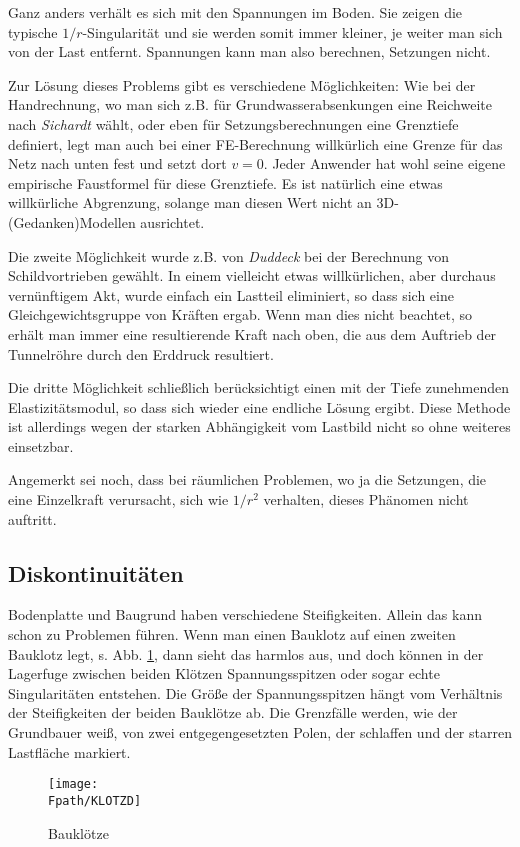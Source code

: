 {{Ganz anders verh\"{a}lt es sich mit den Spannungen im Boden. Sie zeigen die typische $1/r$-Singularit\"{a}t und sie werden somit immer kleiner, je weiter man sich von der Last entfernt. Spannungen kann man also berechnen, Setzungen nicht.

Zur L\"{o}sung dieses Problems gibt es verschiedene M\"{o}glichkeiten: Wie bei der Handrechnung, wo man sich z.B. f\"{u}r Grundwasserabsenkungen eine Reichweite nach {\em Sichardt\/} w\"{a}hlt, oder eben f\"{u}r Setzungsberechnungen eine Grenztiefe definiert, legt man auch bei einer FE-Berechnung willk\"{u}rlich eine Grenze f\"{u}r das Netz nach unten fest und setzt dort $v = 0$. Jeder Anwender hat wohl seine eigene empirische Faustformel f\"{u}r diese Grenztiefe. Es ist nat\"{u}rlich eine etwas willk\"{u}rliche Abgrenzung, solange man diesen Wert nicht an 3D-(Gedanken)Modellen ausrichtet.

Die zweite M\"{o}glichkeit wurde z.B. von {\em Duddeck\/} bei der Berechnung von Schildvortrieben gew\"{a}hlt. In einem vielleicht etwas willk\"{u}rlichen, aber durchaus vern\"{u}nftigem Akt, wurde einfach ein Lastteil eliminiert, so dass sich eine Gleichgewichtsgruppe von Kr\"{a}ften ergab. Wenn man dies nicht beachtet, so erh\"{a}lt man immer eine resultierende Kraft nach oben, die aus dem Auftrieb der Tunnelr\"{o}hre durch den Erddruck resultiert.

Die dritte M\"{o}glichkeit schlie{\ss}lich ber\"{u}cksichtigt einen mit der Tiefe zunehmenden Elastizit\"{a}tsmodul, so dass sich wieder eine endliche L\"{o}sung ergibt. Diese Methode ist allerdings wegen der starken Abh\"{a}ngigkeit vom Lastbild nicht so ohne weiteres einsetzbar.

Angemerkt sei noch, dass bei r\"{a}umlichen Problemen, wo ja die Setzungen, die eine Einzelkraft verursacht, sich wie $1/r^2$ verhalten, dieses Ph\"{a}nomen nicht auftritt.

{\textcolor{sectionTitleBlue}{\subsection{Diskontinuit\"{a}ten}}}
Bodenplatte und Baugrund haben verschiedene Steifigkeiten. Allein das kann schon zu Problemen f\"{u}hren. Wenn man einen Bauklotz auf einen zweiten Bauklotz legt, s. Abb. \ref{Klotz}, dann sieht das harmlos aus, und doch k\"{o}nnen in der Lagerfuge zwischen beiden Kl\"{o}tzen Spannungsspitzen oder sogar echte Singularit\"{a}ten entstehen. Die Gr\"{o}{\ss}e der Spannungsspitzen h\"{a}ngt vom Verh\"{a}ltnis der Steifigkeiten der beiden Baukl\"{o}tze ab. Die Grenzf\"{a}lle werden, wie der Grundbauer wei{\ss}, von zwei entgegengesetzten Polen, der schlaffen und der starren Lastfl\"{a}che markiert.
\begin{figure}[tbp] \centering
\if {} \sidecaption \fi
\texttt{[image: \\Fpath/KLOTZD]}
\caption{Baukl\"{o}tze} \label{Klotz}
\end{figure}%

}}
